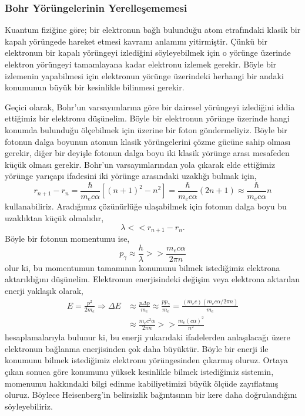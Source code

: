 \documentclass[a4paper,12pt, twoside]{article}
\begin{document}
\subsubsection{Bohr Yörüngelerinin Yerelleşememesi}
Kuantum fiziğine göre; bir elektronun bağlı bulunduğu atom etrafındaki klasik bir kapalı yörüngede hareket etmesi kavramı anlamını yitirmiştir. Çünkü bir elektronun bir kapalı yörüngeyi izlediğini söyleyebilmek için o yörünge üzerinde elektron yörüngeyi tamamlayana kadar elektronu izlemek gerekir. Böyle bir izlemenin yapabilmesi için elektronun yörünge üzerindeki herhangi bir andaki konumunun büyük bir kesinlikle bilinmesi gerekir.

Geçici olarak, Bohr'un varsayımlarına göre bir dairesel yörüngeyi izlediğini iddia ettiğimiz bir elektronu düşünelim. Böyle bir elektronun yörünge üzerinde hangi konumda bulunduğu ölçebilmek için üzerine bir foton göndermeliyiz. Böyle bir fotonun dalga boyunun atomun klasik yörüngelerini çözme gücüne sahip olması gerekir, diğer bir deyişle fotonun dalga boyu iki klasik yörünge arası mesafeden küçük olması gerekir. Bohr'un varsayımlarından yola çıkarak elde ettiğimiz yörünge yarıçapı ifadesini iki yörünge arasındaki uzaklığı bulmak için,
\begin{equation*}
r _ { n + 1 } - r _ { n } = \frac { \hbar } { m _ { e } c \alpha } \left[ ( n + 1 ) ^ { 2 } - n ^ { 2 } \right] = \frac { \hbar } { m _ { e } c \alpha } (2n+1) \approx \frac { \hbar } { m _ { e } c \alpha } n
\end{equation*}
kullanabiliriz. Aradığımız çözünürlüğe ulaşabilmek için fotonun dalga boyu bu uzaklıktan küçük olmalıdır,
\begin{equation*}
\lambda << r _ { n + 1 } - r _ { n }.
\end{equation*}
Böyle bir fotonun momentumu ise,
\begin{equation*}
p_{ \gamma } \approx \frac { h } { \lambda } >> \frac { m _ { e } c \alpha } { 2\pi n }
\end{equation*}
olur ki, bu momentumun tamamının konumunu bilmek istediğimiz elektrona aktarıldığını düşünelim. Elektronun enerjisindeki değişim veya elektrona aktarılan enerji yaklaşık olarak,
\begin{align*}
E = \frac{p^2}{2m_e} \Rightarrow \Delta E &\approx \frac { p \Delta p } { m _ { e } } \approx \frac { p p _ { \gamma } } { m _ { e } } = \frac{(m_e c) (m_e c \alpha/2\pi n)}{m_e}\\
&\approx \frac { m_e c^2 \alpha} { 2\pi n } >> \frac { m _ { e } ( c \alpha ) ^ { 2 } } { n ^ { 2 } }
\end{align*}
hesaplamalarıyla bulunur ki, bu enerji yukarıdaki ifadelerden anlaşılacağı üzere elektronun bağlanma enerjisinden çok daha büyüktür. Böyle bir enerji ile konumunu bilmek istediğimiz elektronu yörüngesinden çıkarmış oluruz. Ortaya çıkan sonuca göre konumunu yüksek kesinlikle bilmek istediğimiz sistemin, momenumu hakkındaki bilgi edinme kabiliyetimizi büyük ölçüde zayıflatmış oluruz. Böylece Heisenberg'in belirsizlik bağıntısının bir kere daha doğrulandığını söyleyebiliriz.
\end{document}
